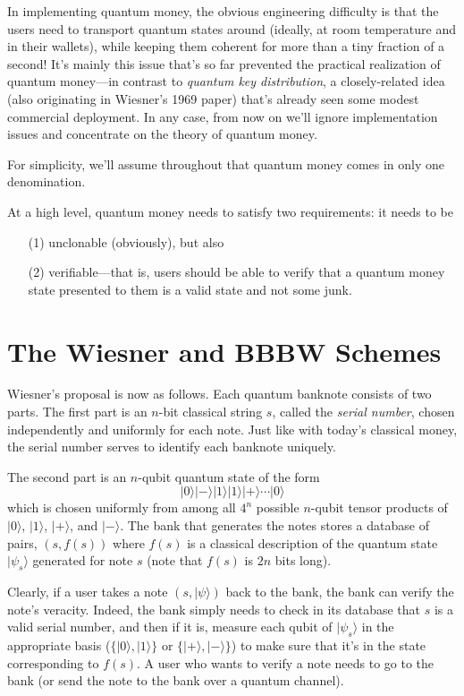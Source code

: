 \documentclass[12pt]{report}
\theoremstyle{plain}
\theoremstyle{definition}
\renewcommand{\ket}[1]{|#1\rangle}
\begin{document}
In implementing quantum money, the obvious engineering difficulty is that the users need to transport quantum states around (ideally, at room temperature and in their wallets), while keeping them coherent for more than a tiny fraction of a second!  It's mainly this issue that's so far prevented the practical realization of quantum money---in contrast to {\em quantum key distribution}, a closely-related idea (also originating in Wiesner's 1969 paper) that's already seen some modest commercial deployment.  In any case, from now on we'll ignore implementation issues and concentrate on the theory of quantum money.

For simplicity, we'll assume throughout that quantum money comes in only one denomination.

At a high level, quantum money needs to satisfy two requirements: it needs to be
\begin{enumerate}
\item[(1)] unclonable (obviously), but also
\item[(2)] verifiable---that is, users should be able to verify that a quantum money state presented to them is a valid state and not some junk.
\end{enumerate}

\section{The Wiesner and BBBW Schemes}

Wiesner's proposal is now as follows.  Each quantum banknote consists of two parts. The first part is an $n$-bit classical string $s$, called the {\em serial number}, chosen independently and uniformly for each note.  Just like with today's classical money, the serial number serves to identify each banknote uniquely.

The second part is an $n$-qubit quantum state of the form
\[ \ket{0} \ket{-} \ket{1} \ket{1} \ket{+} \cdots \ket{0} \]
which is chosen uniformly from among all $4^n$ possible $n$-qubit tensor products of $\ket{0}$, $\ket{1}$, $\ket{+}$, and $\ket{-}$. The bank that generates the notes stores
a database of pairs, $(s,f(s))$ where $f(s)$ is a classical description of the quantum state $\ket{\psi_s}$ generated for note $s$ (note that $f(s)$ is $2n$ bits long).

Clearly, if a user takes a note $(s,\ket{\psi})$ back to the bank, the bank can verify the note's veracity.  Indeed, the bank simply needs to check in its database that $s$ is a valid serial number, and then if it is, measure each qubit of $\ket{\psi_s}$ in the appropriate basis ($\{ \ket{0},\ket{1}\}$ or $\{ \ket{+},\ket{-}\}$) to make sure
that it's in the state corresponding to $f(s)$.  A user who wants to verify a note needs to go to the bank (or send the note to the bank over a quantum channel).
\end{document}
